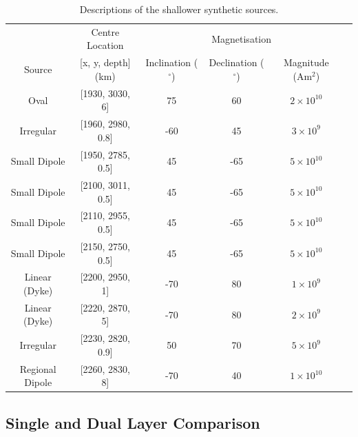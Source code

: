 \begin{table}[tb!]
\centering
\begin{tabular}{c c c c c c}
\toprule
 & Centre Location & \multicolumn{3}{c}{Magnetisation} \\
\cmidrule(lr){2-2} \cmidrule(lr){3-5}
Source & [x, y, depth] (km) & Inclination ($^\circ$) & Declination ($^\circ$) & Magnitude (Am$^2$) \\
\midrule
Oval & [1930, 3030, 6] & 75 & 60 & $2 \times 10^{10}$ \\
Irregular & [1960, 2980, 0.8] & -60 & 45 & $3 \times 10^{9}$ \\
Small Dipole & [1950, 2785, 0.5] & 45 & -65 & $5 \times 10^{10}$ \\
Small Dipole	& [2100, 3011, 0.5] & 45 & -65 & $5 \times 10^{10}$ \\
Small Dipole & [2110, 2955, 0.5] & 45 & -65 & $5 \times 10^{10}$ \\
Small Dipole & [2150, 2750, 0.5] & 45 & -65 & $5 \times 10^{10}$ \\
Linear (Dyke) & [2200, 2950, 1] & -70 & 80 & $1 \times 10^{9}$ \\
Linear (Dyke) & [2220, 2870, 5] & -70 & 80 & $2 \times 10^{9}$ \\
Irregular & [2230, 2820, 0.9] & 50 & 70 & $5 \times 10^{9}$ \\
Regional Dipole & [2260, 2830, 8] & -70 & 40 & $1 \times 10^{10}$ \\
\bottomrule
\end{tabular}
\caption{Descriptions of the shallower synthetic sources.}
\label{table:shallow_sources}
\end{table}

\subsection{Single and Dual Layer Comparison}
\label{sec:single_vs_dual}

